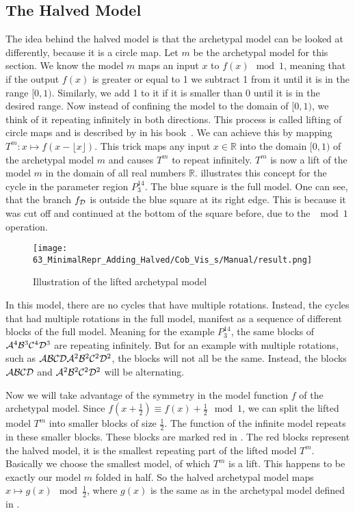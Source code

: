 \subsection{The Halved Model}
\label{sec:add.add.halved}

The idea behind the halved model is that the archetypal model can be looked at differently, because it is a circle map.
Let $m$ be the archetypal model for this section.
We know the model $m$ maps an input $x$ to $f(x) \mod 1$, meaning that if the output $f(x)$ is greater or equal to 1 we subtract 1 from it until it is in the range $[0, 1)$.
Similarly, we add 1 to it if it is smaller than 0 until it is in the desired range.
Now instead of confining the model to the domain of $[0, 1)$, we think of it repeating infinitely in both directions.
This process is called lifting of circle maps and is described by  in his book~\cite{devaney2021introduction}.
We can achieve this by mapping $T^m: x \mapsto f(x - \lfloor x \rfloor)$.
This trick maps any input $x \in \mathbb{R}$ into the domain $[0, 1)$ of the archetypal model $m$ and causes $T^m$ to repeat infinitely.
$T^m$ is now a lift of the model $m$ in the domain of all real numbers $\mathbb{R}$.
 illustrates this concept for the cycle in the parameter region $P^{14}_3$.
The blue square is the full model.
One can see, that the branch $f_{\mathcal{D}}$ is outside the blue square at its right edge.
This is because it was cut off and continued at the bottom of the square before, due to the $\mod 1$ operation.

\begin{figure}
	\centering
	\texttt{[image: 63\_MinimalRepr\_Adding\_Halved/Cob\_Vis\_s/Manual/result.png]}
	\caption{Illustration of the lifted archetypal model}
	\label{fig:add.halved.lift}
\end{figure}

In this model, there are no cycles that have multiple rotations.
Instead, the cycles that had multiple rotations in the full model, manifest as a sequence of different blocks of the full model.
Meaning for the example $P^{14}_3$, the same blocks of $\mathcal{A}^4\mathcal{B}^3\mathcal{C}^4\mathcal{D}^3$ are repeating infinitely.
But for an example with multiple rotations, such as $\mathcal{A}\mathcal{B}\mathcal{C}\mathcal{D}\mathcal{A}^2\mathcal{B}^2\mathcal{C}^2\mathcal{D}^2$, the blocks will not all be the same.
Instead, the blocks $\mathcal{A}\mathcal{B}\mathcal{C}\mathcal{D}$ and $\mathcal{A}^2\mathcal{B}^2\mathcal{C}^2\mathcal{D}^2$ will be alternating.

Now we will take advantage of the symmetry in the model function $f$ of the archetypal model.
Since $f(x + \frac{1}{2}) \equiv f(x) + \frac{1}{2} \mod 1$, we can split the lifted model $T^m$ into smaller blocks of size $\frac{1}{2}$.
The function of the infinite model repeats in these smaller blocks.
These blocks are marked red in .
The red blocks represent the halved model, it is the smallest repeating part of the lifted model $T^m$.
Basically we choose the smallest model, of which $T^m$ is a lift.
This happens to be exactly our model $m$ folded in half.
So the halved archetypal model maps $x \mapsto g(x) \mod \frac{1}{2}$, where $g(x)$ is the same as in the archetypal model defined in .

